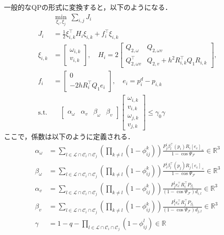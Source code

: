 一般的なQPの形式に変換すると，以下のようになる．
\begin{equation}
\begin{aligned}
&\min_{\xi_i, \xi_j} \: \sum_{i,j}J_i \\
J_i &= \frac{1}{2}\xi_{i,k}^\top H_i\xi_{i,k} + f_i^\top\xi_{i,k} \\
\xi_{i,k} &= \begin{bmatrix}
\omega_{i,k}\\v_{i,k}
\end{bmatrix}, \quad
H_i = 2\begin{bmatrix}
Q_{2,\omega} & Q_{2,\omega v} \\ 
Q^\top_{2,\omega v} & Q_{2,v}+h^2R_{i,k}^\top Q_1R_{i,k}
\end{bmatrix}, \\
f_i &= \begin{bmatrix}
0 \\ -2hR_i^\top Q_1 e_i
\end{bmatrix}, \quad e_i = p^d_{i}-p_{i,k} \\
\mathrm{s.t.} &\quad \begin{bmatrix}
\alpha_\omega & \alpha_v & \beta_\omega & \beta_v
\end{bmatrix}
\begin{bmatrix}
\omega_{i,k} \\ v_{i,k} \\ \omega_{j,k} \\ v_{j,k}
\end{bmatrix} \leq
\gamma_0\gamma
\label{eq:qp_edge_general}
\end{aligned}
\end{equation}
ここで，係数は以下のように定義される．
\begin{equation}
\begin{aligned}
\alpha_\omega &= \sum_{l\in \mathcal{L}\cap\mathcal{C}_i \cap \mathcal{C}_j}(\prod_{k\neq l}(1-\phi_{ij}^k)) \frac{P_j^l\beta_l^\top(p_i) R_i [e_c]_\times}{1-\cos \Psi_\mathcal{F}} \in \mathbb{R}^3 \\
\beta_\omega &= \sum_{l\in \mathcal{L}\cap\mathcal{C}_i \cap \mathcal{C}_j}(\prod_{k\neq l}(1-\phi_{ij}^k)) 
\frac{P_i^l\beta_l^\top(p_j) R_j [e_c]_\times}{1-\cos \Psi_\mathcal{F}} \in \mathbb{R}^3 \\
\alpha_v &= \sum_{l\in \mathcal{L}\cap\mathcal{C}_i \cap \mathcal{C}_j}(\prod_{k\neq l}(1-\phi_{ij}^k))\frac{P_j^le_c^\top R_i^\top P_{\beta_l}}{(1-\cos \Psi_\mathcal{F})d_{i,l}} \in \mathbb{R}^3 \\
\beta_v &= \sum_{l\in \mathcal{L}\cap\mathcal{C}_i \cap \mathcal{C}_j}(\prod_{k\neq l}(1-\phi_{ij}^k))\frac{P_i^le_c^\top R_j^\top P_{\beta_l}}{(1-\cos \Psi_\mathcal{F})d_{j,l}} \in \mathbb{R}^3 \\
\gamma &= 1-q-\prod_{l\in \mathcal{L}\cap\mathcal{C}_i \cap \mathcal{C}_j}(1-\phi_{ij}^l) \in \mathbb{R}
\label{eq:qp_edge_coefficients}
\end{aligned}
\end{equation}

